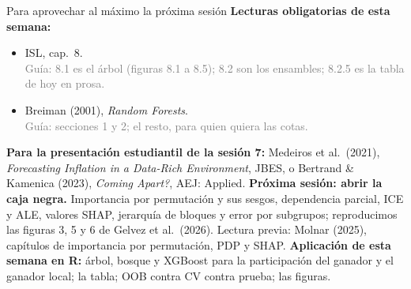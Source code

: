 \documentclass{beamer}
\newcommand{\1}{\mathbb{I}}
\begin{document}
\begin{frame}{Para aprovechar al máximo la próxima sesión}
\small
\textbf{Lecturas obligatorias de esta semana:}
\begin{itemize}\itemsep2pt
  \item ISL, cap.\ 8. \\ \textcolor{gray}{Guía: 8.1 es el árbol (figuras 8.1 a 8.5); 8.2 son los ensambles; 8.2.5 es la tabla de hoy en prosa.}
  \item Breiman (2001), \emph{Random Forests}. \\ \textcolor{gray}{Guía: secciones 1 y 2; el resto, para quien quiera las cotas.}
\end{itemize}
\textbf{Para la presentación estudiantil de la sesión 7:} Medeiros et al.\ (2021), \emph{Forecasting Inflation in a Data-Rich Environment}, JBES, o Bertrand \& Kamenica (2023), \emph{Coming Apart?}, AEJ: Applied.
\pause
\textbf{Próxima sesión: abrir la caja negra.} Importancia por permutación y sus sesgos, dependencia parcial, ICE y ALE, valores SHAP, jerarquía de bloques y error por subgrupos; reproducimos las figuras 3, 5 y 6 de Gelvez et al.\ (2026). Lectura previa: Molnar (2025), capítulos de importancia por permutación, PDP y SHAP.
\pause
\textbf{Aplicación de esta semana en R:} árbol, bosque y XGBoost para la participación del ganador y el ganador local; la tabla; OOB contra CV contra prueba; las figuras.
\end{frame}
\end{document}
